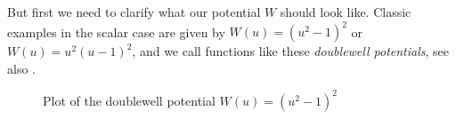 But first we need to clarify what our potential $ W $ should look like. Classic 
examples in the scalar case are given by $ W ( u ) = \left( u^{ 2 } - 1 
\right)^{ 2 } $ or $ W( u ) = u^{ 2 } ( u - 1 )^{ 2 } $, and we call functions 
like these \emph{doublewell potentials}, see also 
.

\begin{figure}[ht]
	\centering
	\caption{Plot of the doublewell potential $ W(u) = (u^2 - 1 )^{ 2 } $}
	\label{graph_of_doublewell_potential}
\end{figure}

